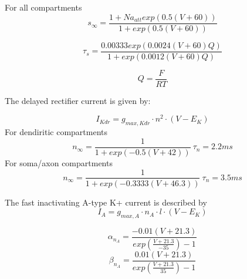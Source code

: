 \documentclass[12pt]{article}
\begin{document}
For all compartments
\begin{equation}
s_{\infty} = \frac{1 + Na_{att} exp(0.5(V+60))}{1 + exp(0.5(V+60))}
\end{equation}
\newline

\begin{equation}
\tau_s = \frac{0.00333 exp(0.0024(V + 60)Q) }{1 + exp(0.0012(V + 60)Q)}
\end{equation}
\newline

\begin{equation}
Q = \frac{F}{RT}
\end{equation}
\newline


The delayed rectifier current is given by:

\begin{equation}
I_{Kdr} = g_{max, Kdr} \cdot n^2 \cdot (V - E_{K})
\end{equation}
For dendiritic compartments
\begin{equation}
n_{\infty} = \frac{1}{1 + exp(-0.5(V + 42))} \ 
\tau_n = 2.2 ms
\end{equation}
For soma/axon compartments
\begin{equation}
n_{\infty} = \frac{1}{1 + exp(-0.3333(V + 46.3))} \ 
\tau_n = 3.5 ms
\end{equation}
\newline

The fast inactivating A-type K+ current is described by
\begin{equation}
I_{A} = g_{max, A} \cdot n_A \cdot l \cdot (V - E_{K})
\end{equation}

\begin{equation}
\alpha_{n_A} = \frac{-0.01(V + 21.3)}{exp( \frac{V + 21.3}{-35}) - 1}
\end{equation}
\newline
\begin{equation}
\beta_{n_A} = \frac{0.01(V + 21.3)}{exp( \frac{V + 21.3}{35}) - 1}
\end{equation}
\newline
\end{document}
